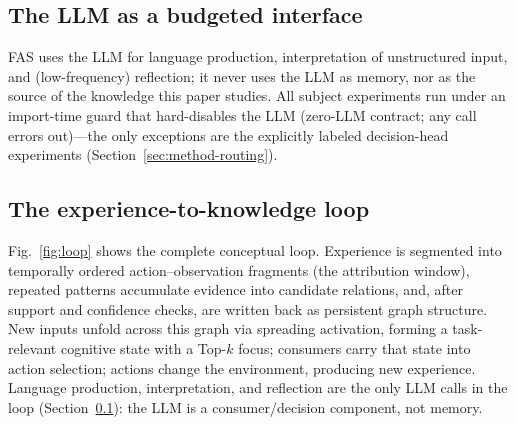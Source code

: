 \documentclass[10pt]{article}
\begin{document}
\subsection{The LLM as a budgeted interface}
\label{sec:arch-llm}
FAS uses the LLM for language production, interpretation of unstructured input, and (low-frequency) reflection; it never uses the LLM as memory, nor as the source of the knowledge this paper studies. All subject experiments run under an import-time guard that hard-disables the LLM (zero-LLM contract; any call errors out)---the only exceptions are the explicitly labeled decision-head experiments (Section~\ref{sec:method-routing}).

\subsection{The experience-to-knowledge loop}
\label{sec:arch-loop}
Fig.~\ref{fig:loop} shows the complete conceptual loop. Experience is segmented into temporally ordered action--observation fragments (the attribution window), repeated patterns accumulate evidence into candidate relations, and, after support and confidence checks, are written back as persistent graph structure. New inputs unfold across this graph via spreading activation, forming a task-relevant cognitive state with a Top-$k$ focus; consumers carry that state into action selection; actions change the environment, producing new experience. Language production, interpretation, and reflection are the only LLM calls in the loop (Section~\ref{sec:arch-llm}): the LLM is a consumer/decision component, not memory.
\end{document}

